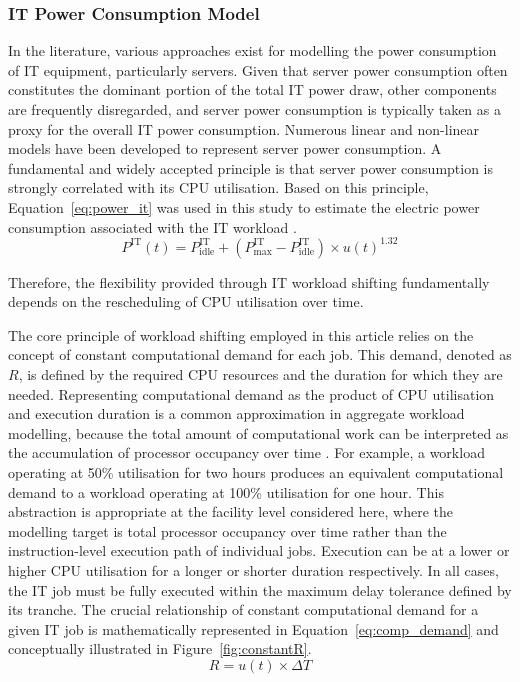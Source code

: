 \documentclass[lettersize,journal]{IEEEtran}
\newcommand{\rev}[1]{\textcolor{blue!70!black}{#1}}
\begin{document}
\subsubsection{IT Power Consumption Model}

 In the literature, various approaches exist for modelling the power consumption of IT equipment, particularly servers. Given that server power consumption often constitutes the dominant portion of the total IT power draw, other components are frequently disregarded, and server power consumption is typically taken as a proxy for the overall IT power consumption. Numerous linear and non-linear models have been developed to represent server power consumption. A fundamental and widely accepted principle is that server power consumption is strongly correlated with its CPU utilisation. \rev{Based on this principle,} Equation~\ref{eq:power_it} was used in this study to estimate the electric power consumption associated with the IT workload \cite{dayarathna2015data,v2015analysis}.
\begin{equation}
P^{\mathrm{IT}}(t) = P^{\mathrm{IT}}_{\mathrm{idle}} + (P^{\mathrm{IT}}_{\mathrm{max}} - P^{\mathrm{IT}}_{\mathrm{idle}}) \times u(t)^{1.32}
\label{eq:power_it}
\end{equation}



Therefore, the flexibility provided through IT workload shifting fundamentally depends on the rescheduling of CPU utilisation over time.

The core principle of workload shifting employed in this article relies on the concept of constant computational demand for each job. This demand, denoted as $R$, is defined by the required CPU resources and the duration for which they are needed. \rev{Representing computational demand as the product of CPU utilisation and execution duration is a common approximation in aggregate workload modelling, because the total amount of computational work can be interpreted as the accumulation of processor occupancy over time \cite{dayarathna2015data,6779441,Cao2022ApEn}. For example, a workload operating at 50\% utilisation for two hours produces an equivalent computational demand to a workload operating at 100\% utilisation for one hour. This abstraction is appropriate at the facility level considered here, where the modelling target is total processor occupancy over time rather than the instruction-level execution path of individual jobs.} Execution can be at a lower or higher CPU utilisation for a longer or shorter duration respectively. In all cases, the IT job must be fully executed within the maximum delay tolerance defined by its tranche. The crucial relationship of constant computational demand for a given IT job is mathematically represented in Equation~\ref{eq:comp_demand} and conceptually illustrated in Figure~\ref{fig:constantR}.
\begin{equation}
R = u(t) \times \Delta T
\label{eq:comp_demand}
\end{equation}
\end{document}
